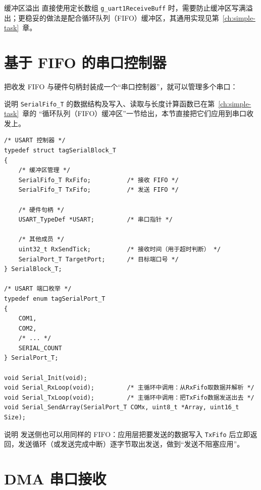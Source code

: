\begin{anybox}{缓冲区溢出}
直接使用定长数组 \texttt{g\_uart1ReceiveBuff} 时，需要防止缓冲区写满溢出；更稳妥的做法是配合循环队列（FIFO）缓冲区，其通用实现见第~\ref{ch:simple-task}~章。
\end{anybox}

\section{基于 FIFO 的串口控制器}

把收发 FIFO 与硬件句柄封装成一个“串口控制器”，就可以管理多个串口：

\begin{anybox}{说明}
\texttt{SerialFifo\_T} 的数据结构及写入、读取与长度计算函数已在第~\ref{ch:simple-task}~章的
“循环队列（FIFO）缓冲区”一节给出，本节直接把它们应用到串口收发上。
\end{anybox}

\begin{lstlisting}[style=c]
/* USART 控制器 */
typedef struct tagSerialBlock_T
{
    /* 缓冲区管理 */
    SerialFifo_T RxFifo;          /* 接收 FIFO */
    SerialFifo_T TxFifo;          /* 发送 FIFO */

    /* 硬件句柄 */
    USART_TypeDef *USART;         /* 串口指针 */

    /* 其他成员 */
    uint32_t RxSendTick;          /* 接收时间（用于超时判断） */
    SerialPort_T TargetPort;      /* 目标端口号 */
} SerialBlock_T;

/* USART 端口枚举 */
typedef enum tagSerialPort_T
{
    COM1,
    COM2,
    /* ... */
    SERIAL_COUNT
} SerialPort_T;

void Serial_Init(void);
void Serial_RxLoop(void);         /* 主循环中调用：从RxFifo取数据并解析 */
void Serial_TxLoop(void);         /* 主循环中调用：把TxFifo数据发送出去 */
void Serial_SendArray(SerialPort_T COMx, uint8_t *Array, uint16_t Size);
\end{lstlisting}

\begin{anybox}{说明}
发送侧也可以用同样的 FIFO：应用层把要发送的数据写入 \texttt{TxFifo} 后立即返回，发送循环（或发送完成中断）逐字节取出发送，做到“发送不阻塞应用”。
\end{anybox}
\section{DMA 串口接收}

